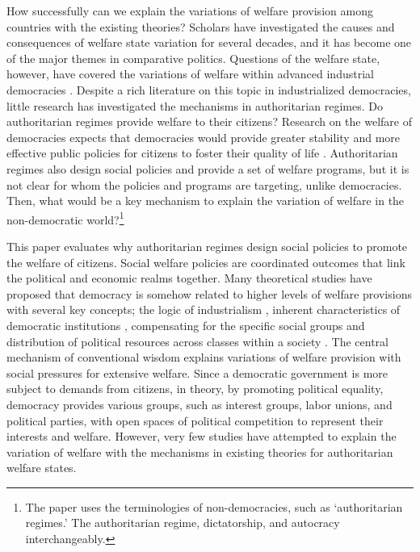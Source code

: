 \documentclass[11pt, notitlepage]{article}
\begin{document}
\noindent How successfully can we explain the variations of welfare provision among countries with the existing theories? Scholars have investigated the causes and consequences of welfare state variation for several decades, and it has become one of the major themes in comparative politics. Questions of the welfare state, however, have covered the variations of welfare within advanced industrial democracies \citep{Pierson1996, Pierson2000}. Despite a rich literature on this topic in industrialized democracies, little research has investigated the mechanisms in authoritarian regimes. Do authoritarian regimes provide welfare to their citizens? Research on the welfare of democracies expects that democracies would provide greater stability and more effective public policies for citizens to foster their quality of life \citep{Gerring2012}. Authoritarian regimes also design social policies and provide a set of welfare programs, but it is not clear for whom the policies and programs are targeting, unlike democracies. Then, what would be a key mechanism to explain the variation of welfare in the non-democratic world?\footnote{The paper uses the terminologies of non-democracies, such as `authoritarian regimes.' The authoritarian regime, dictatorship, and autocracy interchangeably.}\par

This paper evaluates why authoritarian regimes design social policies to promote the welfare of citizens. Social welfare policies are coordinated outcomes that link the political and economic realms together. Many theoretical studies have proposed that democracy is somehow related to higher levels of welfare provisions \citep{Muller1988, Sirowy1990, Korpi1998} with several key concepts; the logic of industrialism \citep{Heclo1974, Wilensky1975, PrzeworskiandLimongi1993}, inherent characteristics of democratic institutions \citep{Muller1988, Pierson1996, Gerring2012}, compensating for the specific social groups \citep{Cameron1978, Rodrik1998, Burgoon2001a, Adsera2002} and distribution of political resources across classes within a society \citep{Korpi1998, Gosta1989, Gosta1990}. The central mechanism of conventional wisdom explains variations of welfare provision with social pressures for extensive welfare. Since a democratic government is more subject to demands from citizens, in theory, by promoting political equality, democracy provides various groups, such as interest groups, labor unions, and political parties, with open spaces of political competition to represent their interests and welfare. However, very few studies have attempted to explain the variation of welfare with the mechanisms in existing theories for authoritarian welfare states.\par
\end{document}
